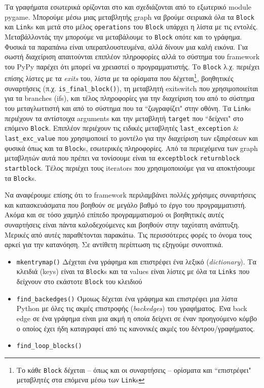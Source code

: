 Τα γραφήματα εσωτερικά ορίζονται στο  και
σχεδιάζονται από το εξωτερικό module pygame. Μπορούμε μέσω μιας μεταβλητής graph
να βρούμε σειριακά όλα τα \texttt{Block} και \texttt{Link}s και μετά στο μέλος
\texttt{operations} του \texttt{Block} υπάρχει η λίστα με τις εντολές.
Μεταβάλλοντάς την μπορούμε να μεταβάλουμε το \texttt{Block} οπότε και το
γράφημα. Φυσικά τα παραπάνω είναι υπεραπλουστευμένα, αλλά δίνουν μια καλή
εικόνα. Για σωστή διαχείριση απαιτούνται επιπλέον πληροφορίες αλλά το σύστημα
του framework του PyPy παρέχει ότι μπορεί να χρειαστεί ο προγραμματιστής. Το
\texttt{Block} λ.χ. περιέχει επίσης λίστες με τα \textit{exits} του, λίστα με τα
ορίσματα που δέχεται\footnote{Το κάθε \texttt{Block} δέχεται – όπως και οι
συναρτήσεις – ορίσματα και ``επιστρέφει" μεταβλητές στα επόμενα μέσω των
\texttt{Link}s}, βοηθητικές συναρτήσεις (π.χ. \texttt{is\_final\_block()}), τη
μεταβλητή exitswitch που χρησιμοποιείται για τα branches (ifs), και τέλος
πληροφορίες για την διαχείριση του από το σύστημα του μεταγλωττιστή και από το
σύστημα που τα ``ζωγραφίζει" στην οθόνη. Τα \texttt{Link}s περιέχουν τα
αντίστοιχα arguments και την μεταβλητή \texttt{target} που ``δείχνει" στο επόμενο
\texttt{Block}. Επιπλέον περιέχουν τις ειδικές μεταβλητές
\texttt{last\_exception} \& \texttt{last\_exc\_value} που χρησιμοποιεί το
μοντέλο για την διαχείριση των εξαιρέσεων και φυσικά όπως και τα
\texttt{Block}s, εσωτερικές πληροφορίες. Από τα περιεχόμενα των graph μεταβλητών
αυτά που πρέπει να τονίσουμε είναι τα \texttt{exceptblock} \texttt{returnblock}
\texttt{startblock}. Τέλος περιέχει τους iterators που χρησιμοποιούμε για να
αποκτήσουμε τα \texttt{Block}s.

Να αναφέρουμε επίσης ότι το framework περιλαμβάνει πολλές χρήσιμες συναρτήσεις
και κατασκευάσματα που βοηθούν σε μεγάλο βαθμό το έργο του προγραμματιστή. Ακόμα
και σε τόσο χαμηλό επίπεδο προγραμματισμού οι βοηθητικές αυτές συναρτήσεις είναι
πάντα καλοδεχούμενες και βοηθούν στην ταχύτατη ανάπτυξη. Μερικές από αυτές
παραθέτονται παρακάτω. Τις περισσότερες φορές το όνομα τους αρκεί για την
κατανόηση. Σε αντίθετη περίπτωση τις εξηγούμε συνοπτικά.

\begin{itemize}

\item \texttt{mkentrymap()} Δέχεται ένα γράφημα και επιστρέφει ένα λεξικό
(\textit{dictionary}). Τα κλειδιά (keys) είναι τα \texttt{Block}s και τα values
είναι λίστες με όλα τα \texttt{Links} που δείχνουν στο εκάστοτε \texttt{Block}
του κλειδιού

\item \texttt{find\_backedges()} Όμοιως δέχεται ένα γράφημα και επιστρέφει μια
λίστα Python με όλες τις ακμές επιστροφής (\textit{backedges}) του γραφήματος.
Ένα back edge σε ένα γράφημα είναι μια ακμή η οποία δείχνει σε έναν προηγούμενο
κόμβο ο οποίος έχει ήδη καταγραφεί από τις κανονικές ακμές του
δέντρου/γραφήματος.

\item \texttt{find\_loop\_blocks()}

\end{itemize}

